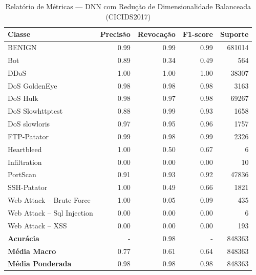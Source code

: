 \begin{table}[H]
    \centering
    \small
    \begin{tabular}{lrrrr}
        \hline
        Classe                     & Precisão & Revocação & F1-score & Suporte \\
        \hline
        BENIGN                     & 0.99     & 0.99      & 0.99     & 681014  \\
        Bot                        & 0.89     & 0.34      & 0.49     & 564     \\
        DDoS                       & 1.00     & 1.00      & 1.00     & 38307   \\
        DoS GoldenEye              & 0.98     & 0.98      & 0.98     & 3163    \\
        DoS Hulk                   & 0.98     & 0.97      & 0.98     & 69267   \\
        DoS Slowhttptest           & 0.88     & 0.99      & 0.93     & 1658    \\
        DoS slowloris              & 0.97     & 0.95      & 0.96     & 1757    \\
        FTP-Patator                & 0.99     & 0.98      & 0.99     & 2326    \\
        Heartbleed                 & 1.00     & 0.50      & 0.67     & 6       \\
        Infiltration               & 0.00     & 0.00      & 0.00     & 10      \\
        PortScan                   & 0.91     & 0.93      & 0.92     & 47836   \\
        SSH-Patator                & 1.00     & 0.49      & 0.66     & 1821    \\
        Web Attack – Brute Force   & 1.00     & 0.05      & 0.09     & 435     \\
        Web Attack – Sql Injection & 0.00     & 0.00      & 0.00     & 6       \\
        Web Attack – XSS           & 0.00     & 0.00      & 0.00     & 193     \\
        \hline
        \textbf{Acurácia}          & -        & 0.98      & -        & 848363  \\
        \textbf{Média Macro}       & 0.77     & 0.61      & 0.64     & 848363  \\
        \textbf{Média Ponderada}   & 0.98     & 0.98      & 0.98     & 848363  \\
        \hline
    \end{tabular}
    \caption{Relatório de Métricas — DNN com Redução de Dimensionalidade Balanceada (CICIDS2017)}
    \label{table:dnn_cicids_reducao_balanced_metricas}
\end{table}
